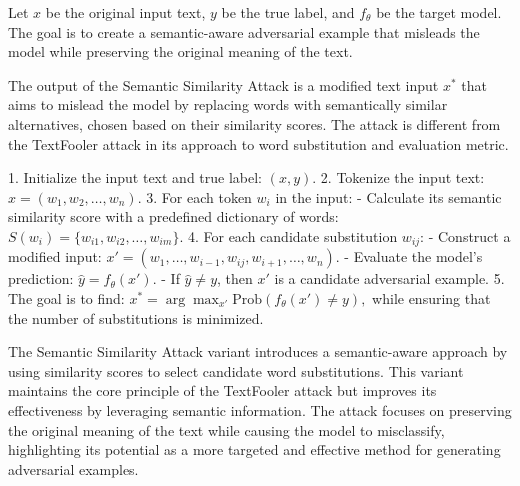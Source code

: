 Let \( x \) be the original input text, \( y \) be the true label, and \( f_{\theta} \) be the target model. The goal is to create a semantic-aware adversarial example that misleads the model while preserving the original meaning of the text.

The output of the Semantic Similarity Attack is a modified text input \( x^* \) that aims to mislead the model by replacing words with semantically similar alternatives, chosen based on their similarity scores. The attack is different from the TextFooler attack in its approach to word substitution and evaluation metric.

1. Initialize the input text and true label:
   $
   (x, y).
   $
2. Tokenize the input text:
   $
   x = (w_1, w_2, \ldots, w_n).
   $
3. For each token \( w_i \) in the input:
   - Calculate its semantic similarity score with a predefined dictionary of words:
   $
   S(w_i) = \{w_{i1}, w_{i2}, \ldots, w_{im}\}.
   $
4. For each candidate substitution \( w_{ij} \):
   - Construct a modified input:
   $
   x' = (w_1, \ldots, w_{i-1}, w_{ij}, w_{i+1}, \ldots, w_n).
   $
   - Evaluate the model's prediction:
   $
   \hat{y} = f_{\theta}(x').
   $
   - If \( \hat{y} \neq y \), then \( x' \) is a candidate adversarial example.
5. The goal is to find:
   $
   x^* = \arg\max_{x'} \text{Prob}(f_{\theta}(x') \neq y),
   $
   while ensuring that the number of substitutions is minimized.

The Semantic Similarity Attack variant introduces a semantic-aware approach by using similarity scores to select candidate word substitutions. This variant maintains the core principle of the TextFooler attack but improves its effectiveness by leveraging semantic information. The attack focuses on preserving the original meaning of the text while causing the model to misclassify, highlighting its potential as a more targeted and effective method for generating adversarial examples.
